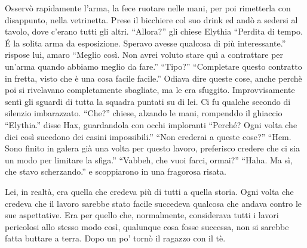     Osservò rapidamente l'arma, la fece ruotare nelle mani, per poi
    rimetterla con disappunto, nella vetrinetta. Prese il bicchiere col suo
    drink ed andò a sedersi al tavolo, dove c'erano tutti gli altri.
    ``Allora?'' gli chiese Elythia ``Perdita di tempo. \'E la solita arma
    da esposizione. Speravo avesse qualcosa di più interessante.'' rispose
    lui, amaro ``Meglio così. Non avrei voluto stare quì a contrattare per
    un'arma quando abbiamo meglio da fare.'' ``Tipo?'' ``Completare questo
    contratto in fretta, visto che è una cosa facile facile.'' Odiava dire
    queste cose, anche perchè poi si rivelavano completamente sbagliate, ma
    le era sfuggito. Improvvisamente sentì gli sguardi di tutta la squadra
    puntati su di lei. Ci fu qualche secondo di silenzio imbarazzato.
    ``Che?'' chiese, alzando le mani, rompenddo il ghiaccio ``Elythia.'' disse
    Hax, guardandola con occhi imploranti ``Perché? Ogni volta che dici
    così sucedono dei casini impossibili.'' ``Non crederai a queste cose?''
    ``Hem. Sono finito in galera già una volta per questo lavoro,
    preferisco credere che ci sia un modo per limitare la sfiga.''
    ``Vabbeh, che vuoi farci, ormai?'' ``Haha. Ma sì, che stavo
    scherzando.'' e scoppiarono in una fragorosa risata.

    Lei, in realtà, era quella che credeva più di tutti a quella storia.
    Ogni volta che credeva che il lavoro sarebbe stato facile succedeva
    qualcosa che andava contro le sue aspettative. Era per quello che,
    normalmente, considerava tutti i lavori pericolosi allo stesso modo
    così, qualunque cosa fosse successa, non si sarebbe fatta buttare a
    terra. Dopo un po' tornò il ragazzo con il tè.

